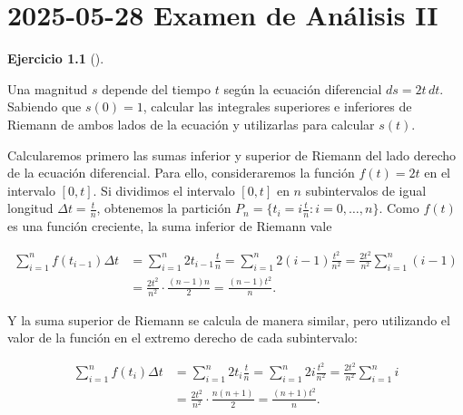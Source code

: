 \documentclass[
  a4paper,
]{scrreport}
\theoremstyle{definition}
\newtheorem{exercise}{Ejercicio}[chapter]
\theoremstyle{remark}
\begin{document}
\chapter{\texorpdfstring{2025-05-28 Examen de Análisis
II}{2025-05-28  Examen de Análisis II}}\label{examen-de-anuxe1lisis-ii-5}

\begin{exercise}[]\protect\hypertarget{exr-1}{}\label{exr-1}

Una magnitud \(s\) depende del tiempo \(t\) según la ecuación
diferencial \(ds = 2t\,dt\). Sabiendo que \(s(0) = 1\), calcular las
integrales superiores e inferiores de Riemann de ambos lados de la
ecuación y utilizarlas para calcular \(s(t)\).

\end{exercise}

\begin{tcolorbox}[enhanced jigsaw, opacityback=0, bottomtitle=1mm, coltitle=black, opacitybacktitle=0.6, colback=white, breakable, left=2mm, titlerule=0mm, bottomrule=.15mm, colbacktitle=quarto-callout-tip-color!10!white, toprule=.15mm, leftrule=.75mm, arc=.35mm, toptitle=1mm, colframe=quarto-callout-tip-color-frame, title=\textcolor{quarto-callout-tip-color}{\faLightbulb}\hspace{0.5em}{Solución}, rightrule=.15mm]

Calcularemos primero las sumas inferior y superior de Riemann del lado
derecho de la ecuación diferencial. Para ello, consideraremos la función
\(f(t) = 2t\) en el intervalo \([0,t]\). Si dividimos el intervalo
\([0,t]\) en \(n\) subintervalos de igual longitud
\(\Delta t = \frac{t}{n}\), obtenemos la partición
\(P_n = \{t_i = i\frac{t}{n}: i = 0, \ldots, n\}\). Como \(f(t)\) es una
función creciente, la suma inferior de Riemann vale

\begin{align*}
\sum_{i=1}^{n} f(t_{i-1}) \Delta t 
&= \sum_{i=1}^{n} 2t_{i-1} \frac{t}{n}
= \sum_{i=1}^{n} 2(i-1)\frac{t^2}{n^2}
= \frac{2t^2}{n^2} \sum_{i=1}^{n} (i-1) \\
&= \frac{2t^2}{n^2} \cdot \frac{(n-1)n}{2} 
= \frac{(n-1)t^2}{n}.
\end{align*}

Y la suma superior de Riemann se calcula de manera similar, pero
utilizando el valor de la función en el extremo derecho de cada
subintervalo:

\begin{align*}
\sum_{i=1}^{n} f(t_i) \Delta t
&= \sum_{i=1}^{n} 2t_i \frac{t}{n} 
= \sum_{i=1}^{n} 2i\frac{t^2}{n^2} 
= \frac{2t^2}{n^2} \sum_{i=1}^{n} i \\
&= \frac{2t^2}{n^2} \cdot \frac{n(n+1)}{2} 
= \frac{(n+1)t^2}{n}.
\end{align*}


\end{tcolorbox}
\end{document}
